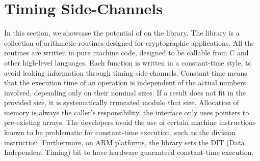\section{Timing Side-Channels}


In this section, we showcase the potential of \timesec{} on the \bignum{} library.
%
%
The \bignum{} library is a collection of arithmetic routines designed for cryptographic applications.
All the routines are written in pure machine code, designed to be callable from C and other high-level languages.
Each function is written in a constant-time style, to avoid leaking information through timing side-channels.
Constant-time means that the execution time of an \bignum{} operation is independent of the actual numbers involved,
depending only on their nominal sizes.
If a result does not fit in the provided size, it is systematically truncated modulo that size.
Allocation of memory is always the caller's responsibility, the \bignum{} interface only uses pointers to pre-existing arrays.
The developers avoid the use of certain machine instructions known to be problematic for constant-time execution, such as the division instruction.
Furthermore, on ARM platforms, the library sets the DIT (Data Independent Timing) bit to have hardware guaranteed constant-time execution.

